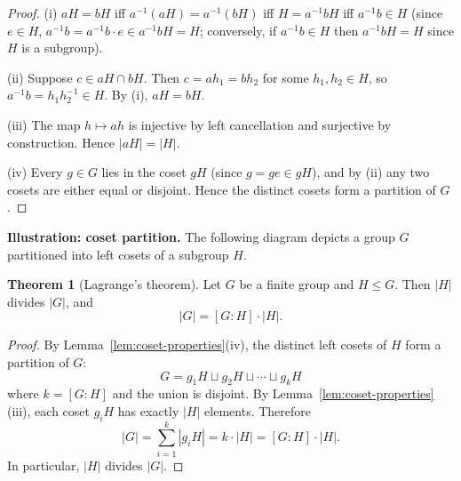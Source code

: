 \documentclass[12pt,a4paper,openany]{book}
\theoremstyle{definition}
\newtheorem{theorem}{Theorem}[chapter]
\theoremstyle{remark}
\begin{document}
\begin{proof}
(i) $aH=bH$ iff $a^{-1}(aH)=a^{-1}(bH)$ iff $H=a^{-1}bH$ iff
$a^{-1}b\in H$ (since $e\in H$, $a^{-1}b=a^{-1}b\cdot e\in a^{-1}bH=H$;
conversely, if $a^{-1}b\in H$ then $a^{-1}bH=H$ since $H$ is a subgroup).

(ii) Suppose $c\in aH\cap bH$.  Then $c=ah_1=bh_2$ for some
$h_1,h_2\in H$, so $a^{-1}b=h_1h_2^{-1}\in H$.  By (i), $aH=bH$.

(iii) The map $h\mapsto ah$ is injective by left cancellation and
surjective by construction.  Hence $|aH|=|H|$.

(iv) Every $g\in G$ lies in the coset $gH$ (since $g=ge\in gH$), and by
(ii) any two cosets are either equal or disjoint.  Hence the distinct cosets
form a partition of $G$.
\end{proof}

\medskip

\noindent\textbf{Illustration: coset partition.}  The following diagram
depicts a group $G$ partitioned into left cosets of a subgroup $H$.

\begin{center}
\end{center}

\begin{theorem}[Lagrange's theorem]
\label{thm:lagrange}
Let $G$ be a finite group and $H\le G$.  Then $|H|$ divides $|G|$, and
\[
  |G| = [G:H]\cdot|H|.
\]
\end{theorem}

\begin{proof}
By Lemma~\ref{lem:coset-properties}(iv), the distinct left cosets of $H$
form a partition of $G$:
\[
  G = g_1H \sqcup g_2H \sqcup \cdots \sqcup g_kH
\]
where $k=[G:H]$ and the union is disjoint.  By
Lemma~\ref{lem:coset-properties}(iii), each coset $g_iH$ has exactly $|H|$
elements.  Therefore
\[
  |G| = \sum_{i=1}^{k}|g_iH| = k\cdot|H| = [G:H]\cdot|H|.
\]
In particular, $|H|$ divides $|G|$.
\end{proof}
\end{document}
